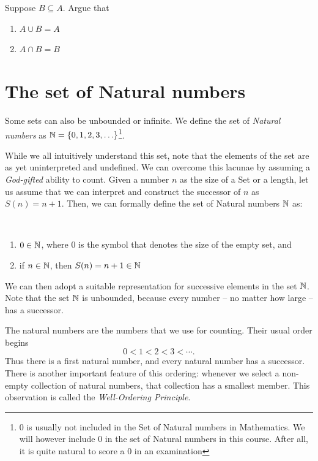 \begin{exercise}
Suppose $B \subseteq A$. Argue that
\begin{enumerate}
\item $A \cup B = A$
\item $A \cap B = B$
\end{enumerate}
\end{exercise}

\section{The set of Natural numbers}

Some sets can also be unbounded or infinite. We define the set of {\em Natural numbers} as $\mathbb{N} = \{0,1,2,3,\ldots\}$\footnote{0 is usually not included in the Set of Natural numbers in Mathematics. We will however include 0 in the set of Natural numbers in this course. After all,  it is quite natural to score a 0 in an examination}. 

While we all intuitively  understand this set, note that the elements of the set are as yet uninterpreted and undefined. We can overcome this lacunae by assuming a {\em God-gifted} ability to count. Given a number $n$ as the size of a Set or a length, let us assume that we can interpret and construct the successor of $n$ as $S(n) = n+1$. Then, we can formally define the set of Natural numbers $\mathbb{N}$ as:

\begin{definition}
~ \newline
\begin{enumerate}
\item $0 \in \mathbb{N}$, where $0$ is the symbol that denotes the size of the empty set, and
\item if $n \in \mathbb{N}$,  then $S(n) = n+1 \in \mathbb{N}$
\end{enumerate}
\end{definition}

We can then adopt a suitable representation for  successive elements in the set $\mathbb{N}$. Note that the set $\mathbb{N}$ is unbounded, because every number -- no matter how large -- has a successor.

The natural numbers are the numbers that we use for counting. Their usual order
begins
\[
0<1<2<3<\cdots.
\]
Thus there is a first natural number, and every natural number has a successor.
There is another important feature of this ordering: whenever we select a
non-empty collection of natural numbers, that collection has a smallest member.
This observation is called the \emph{Well-Ordering Principle}.

